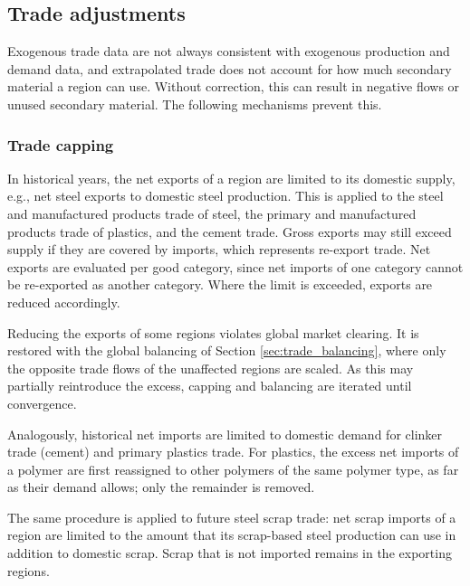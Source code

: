 \subsection{Trade adjustments} \label{sec:trade_adjustments}

Exogenous trade data are not always consistent with exogenous production and demand data, and extrapolated trade does not account for how much secondary material a region can use. Without correction, this can result in negative flows or unused secondary material. The following mechanisms prevent this.

\subsubsection{Trade capping}

In historical years, the net exports of a region are limited to its domestic supply, e.g., net steel exports to domestic steel production. This is applied to the steel and manufactured products trade of steel, the primary and manufactured products trade of plastics, and the cement trade. Gross exports may still exceed supply if they are covered by imports, which represents re-export trade. Net exports are evaluated per good category, since net imports of one category cannot be re-exported as another category. Where the limit is exceeded, exports are reduced accordingly.

Reducing the exports of some regions violates global market clearing. It is restored with the global balancing of Section \ref{sec:trade_balancing}, where only the opposite trade flows of the unaffected regions are scaled. As this may partially reintroduce the excess, capping and balancing are iterated until convergence.

Analogously, historical net imports are limited to domestic demand for clinker trade (cement) and primary plastics trade. For plastics, the excess net imports of a polymer are first reassigned to other polymers of the same polymer type, as far as their demand allows; only the remainder is removed.

The same procedure is applied to future steel scrap trade: net scrap imports of a region are limited to the amount that its scrap-based steel production can use in addition to domestic scrap. Scrap that is not imported remains in the exporting regions.

